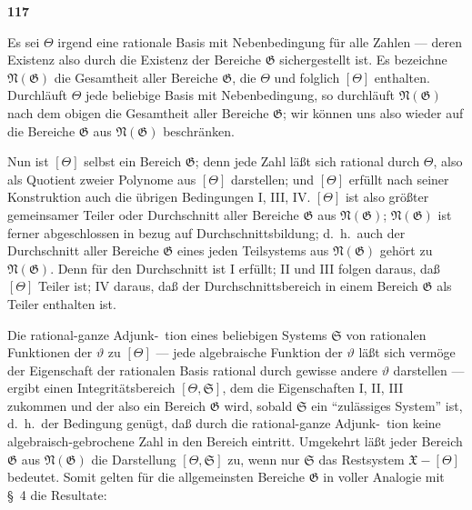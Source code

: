 \documentclass[12pt,a4paper]{article}
\begin{document}
\newpage
\begin{center}
\textbf{117}
\end{center}

Es sei $\Theta$ irgend eine rationale Basis mit Nebenbedingung f\"ur alle Zahlen --- deren Existenz also durch die Existenz der Bereiche $\mathfrak{G}$ sichergestellt ist. Es bezeichne $\mathfrak{N}(\mathfrak{G})$ die Gesamtheit aller Bereiche $\mathfrak{G}$, die $\Theta$ und folglich $[\Theta]$ enthalten. Durchl\"auft $\Theta$ jede beliebige Basis mit Nebenbedingung, so durchl\"auft $\mathfrak{N}(\mathfrak{G})$ nach dem obigen die Gesamtheit aller Bereiche $\mathfrak{G}$; wir k\"onnen uns also wieder auf die Bereiche $\mathfrak{G}$ aus $\mathfrak{N}(\mathfrak{G})$ beschr\"anken.

Nun ist $[\Theta]$ selbst ein Bereich $\mathfrak{G}$; denn jede Zahl l\"a\ss t sich rational durch $\Theta$, also als Quotient zweier Polynome aus $[\Theta]$ darstellen; und $[\Theta]$ erf\"ullt nach seiner Konstruktion auch die \"ubrigen Bedingungen I, III, IV. $[\Theta]$ ist also gr\"o\ss ter gemeinsamer Teiler oder Durchschnitt aller Bereiche $\mathfrak{G}$ aus $\mathfrak{N}(\mathfrak{G})$; $\mathfrak{N}(\mathfrak{G})$ ist ferner abgeschlossen in bezug auf Durchschnittsbildung; d.\ h.\ auch der Durchschnitt aller Bereiche $\mathfrak{G}$ eines jeden Teilsystems aus $\mathfrak{N}(\mathfrak{G})$ geh\"ort zu $\mathfrak{N}(\mathfrak{G})$. Denn f\"ur den Durchschnitt ist I erf\"ullt; II und III folgen daraus, da\ss{} $[\Theta]$ Teiler ist; IV daraus, da\ss{} der Durchschnittsbereich in einem Bereich $\mathfrak{G}$ als Teiler enthalten ist.

Die rational-ganze Adjunk-\ tion eines beliebigen Systems $\mathfrak{S}$ von rationalen Funktionen der $\vartheta$ zu $[\Theta]$ --- jede algebraische Funktion der $\vartheta$ l\"a\ss t sich verm\"oge der Eigenschaft der rationalen Basis rational durch gewisse andere $\vartheta$ darstellen --- ergibt einen Integrit\"atsbereich $[\Theta, \mathfrak{S}]$, dem die Eigenschaften I, II, III zukommen und der also ein Bereich $\mathfrak{G}$ wird, sobald $\mathfrak{S}$ ein ``zul\"assiges System'' ist, d.\ h.\ der Bedingung gen\"ugt, da\ss{} durch die rational-ganze Adjunk-\ tion keine algebraisch-gebrochene Zahl in den Bereich eintritt. Umgekehrt l\"a\ss t jeder Bereich $\mathfrak{G}$ aus $\mathfrak{N}(\mathfrak{G})$ die Darstellung $[\Theta, \mathfrak{S}]$ zu, wenn nur $\mathfrak{S}$ das Restsystem $\mathfrak{X} - [\Theta]$ bedeutet. Somit gelten f\"ur die allgemeinsten Bereiche $\mathfrak{G}$ in voller Analogie mit \S\ 4 die Resultate:
\end{document}
